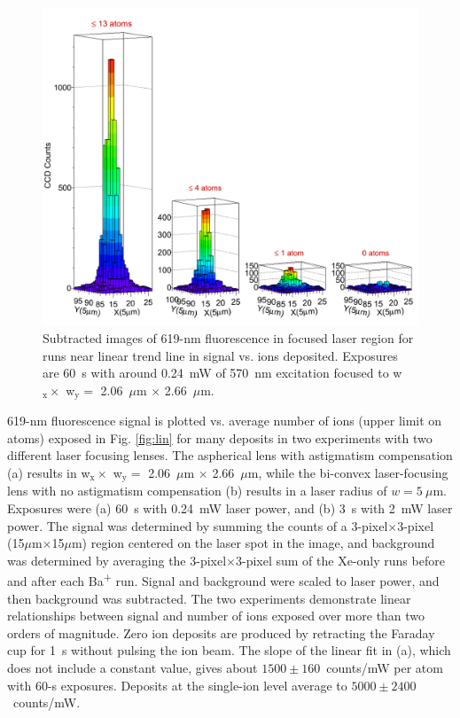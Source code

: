 \begin{figure} %
        \centering
                \includegraphics[width=.99\textwidth]{figures/train.png}
                \caption{Subtracted images of 619-nm fluorescence in focused laser region for runs near linear trend line in signal vs. ions deposited.  Exposures are 60~s with around 0.24~mW of 570~nm excitation focused to w$_{\text{x}} \times$ w$_{\text{y}} =$ 2.06~$\mu$m $\times$ 2.66~$\mu$m.}
\label{fig:train}
\end{figure}

619-nm fluorescence signal is plotted vs. average number of ions (upper limit on atoms) exposed in Fig. \ref{fig:lin} for many deposits in two experiments with two different laser focusing lenses.  The aspherical lens with astigmatism compensation (a) results in w$_{\text{x}} \times$ w$_{\text{y}} =$ 2.06~$\mu$m $\times$ 2.66~$\mu$m, while the bi-convex laser-focusing lens with no astigmatism compensation (b) results in a laser radius of $w = 5~\mu$m.  Exposures were (a) 60~s with 0.24~mW laser power, and (b) 3~s with 2~mW laser power.  The signal was determined by summing the counts of a 3-pixel$\times$3-pixel (15$\mu$m$\times$15$\mu$m) region centered on the laser spot in the image, and background was determined by averaging the 3-pixel$\times$3-pixel sum of the Xe-only runs before and after each Ba\textsuperscript{+} run.  Signal and background were scaled to laser power, and then background was subtracted.  The two experiments demonstrate linear relationships between signal and number of ions exposed over more than two orders of magnitude.  Zero ion deposits are produced by retracting the Faraday cup for 1~s without pulsing the ion beam.  The slope of the linear fit in (a), which does not include a constant value, gives about $1500 \pm 160$~counts/mW per atom with 60-s exposures.  Deposits at the single-ion level average to $5000 \pm 2400$~counts/mW.

